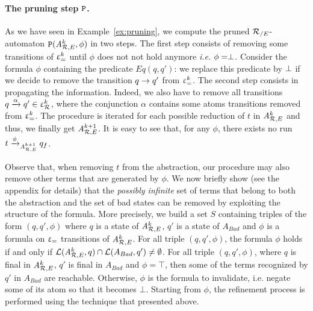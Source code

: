 \paragraph{The pruning step $\mathtt{P}$.}
\label{subsec:refinementstep}
As we have seen in Example~\ref{ex:pruning}, we compute the pruned
${\mathcal R_{/E}}$-automaton $\mathtt{P}({\it A}_{\mathcal R,E}^k, \phi)$ in two steps. The first step
consists of removing some transitions of $\upvarepsilon_{=}^k$ until $\phi$ does
not not hold anymore {\em i.e.} $\phi = \perp$.  Consider the
formula $\phi$ containing the predicate $Eq(q,q')$: we replace this
predicate by $\perp$ if we decide to remove the transition $q \rightarrow
q'$ from $\upvarepsilon_{=}^k$.  The second step consists in propagating the
information. Indeed, we also have to remove all transitions $q
\xrightarrow{\alpha} q' \in \upvarepsilon_{\mathcal R}^k$, where the conjunction $\alpha$ contains
some atoms transitions removed from $\upvarepsilon_{=}^k$.  The procedure is
iterated for each possible reduction of $t$ in ${\it A}_{\mathcal R,E}^k$ and thus,
we finally get ${\it A}_{\mathcal R,E}^{k+1}$.  It is easy to see that, for any
$\phi$, there exists no run $t \xrightarrow{\phi}_{{\it A}_{\mathcal R,E}^{k+1}} q_f$.

Observe that, when removing $t$ from the abstraction, our procedure
may also remove other terms that are generated by $\phi$. We now
briefly show (see the appendix for details) that the {\em possibly
  infinite} set of terms that belong to both the abstraction and the
set of bad states can be removed by exploiting the structure of the
formula. More precisely, we build a set $S$ containing triples of the
form $(q,q',\phi)$ where $q$ is a state of ${\it A}_{\mathcal R,E}^k$, $q'$ is a
state of $A_{Bad}$ and $\phi$ is a formula on $\upvarepsilon_{=}$ transitions of
${\it A}_{\mathcal R,E}^k$.  For all triple $(q,q',\phi)$, the formula $\phi$ holds
if and only if $\mathcal{L}({\it A}_{\mathcal R,E}^k,q)\cap \mathcal{L}(A_{Bad},q')\not=
\emptyset$. For all triple $(q,q',\phi)$, where $q$ is final in
${\it A}_{\mathcal R,E}^k$, $q'$ is final in $A_{Bad}$ and $\phi = \top$, then some
of the terms recognized by $q'$ in $A_{Bad}$ are reachable.
Otherwise, $\phi$ is the formula to invalidate, i.e. negate some of
its atom so that it becomes $\bot$. Starting from $\phi$, the
refinement process is performed using the technique that presented
above.

\vspace{-.6cm}
%

